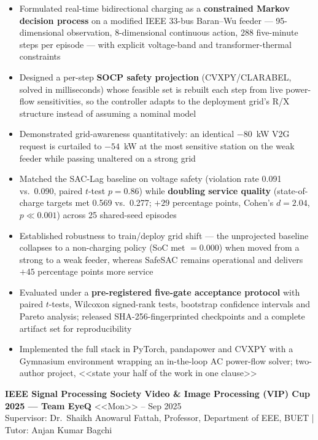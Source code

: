 \begin{itemize}
  \item Formulated real-time bidirectional charging as a \textbf{constrained Markov decision process} on a modified IEEE 33-bus Baran--Wu feeder --- 95-dimensional observation, 8-dimensional continuous action, 288 five-minute steps per episode --- with explicit voltage-band and transformer-thermal constraints
  \item Designed a per-step \textbf{SOCP safety projection} (CVXPY/CLARABEL, solved in milliseconds) whose feasible set is rebuilt each step from live power-flow sensitivities, so the controller adapts to the deployment grid's R/X structure instead of assuming a nominal model
  \item Demonstrated grid-awareness quantitatively: an identical $-80$~kW V2G request is curtailed to $-54$~kW at the most sensitive station on the weak feeder while passing unaltered on a strong grid
  \item Matched the SAC-Lag baseline on voltage safety (violation rate 0.091 vs.\ 0.090, paired $t$-test $p = 0.86$) while \textbf{doubling service quality} (state-of-charge targets met 0.569 vs.\ 0.277; $+29$ percentage points, Cohen's $d = 2.04$, $p \ll 0.001$) across 25 shared-seed episodes
  \item Established robustness to train/deploy grid shift --- the unprojected baseline collapses to a non-charging policy (SoC met $= 0.000$) when moved from a strong to a weak feeder, whereas SafeSAC remains operational and delivers $+45$ percentage points more service
  \item Evaluated under a \textbf{pre-registered five-gate acceptance protocol} with paired $t$-tests, Wilcoxon signed-rank tests, bootstrap confidence intervals and Pareto analysis; released SHA-256-fingerprinted checkpoints and a complete artifact set for reproducibility
  \item Implemented the full stack in PyTorch, pandapower and CVXPY with a Gymnasium environment wrapping an in-the-loop AC power-flow solver; two-author project, <<state your half of the work in one clause>>
\end{itemize}

\vspace{6pt}

\textbf{IEEE Signal Processing Society Video \& Image Processing (VIP) Cup 2025 --- Team EyeQ}
\hfill <<Mon>> -- Sep 2025\\
Supervisor: Dr.\ Shaikh Anowarul Fattah, Professor, Department of EEE, BUET \quad|\quad
Tutor: Anjan Kumar Bagchi

